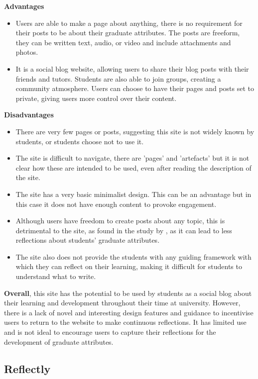 \documentclass{l4proj}
\begin{document}
\textbf{Advantages}
\begin{itemize}
    \item Users are able to make a page about anything, there is no requirement for their posts to be about their graduate attributes. The posts are freeform, they can be written text, audio, or video and include attachments and photos.
    \item It is a social blog website, allowing users to share their blog posts with their friends and tutors. Students are also able to join groups, creating 
    a community atmosphere. Users can choose to have their pages and posts set to private, giving users more control over their content.
\end{itemize}

\textbf{Disadvantages}
\begin{itemize}
    \item There are very few pages or posts, suggesting this site is not widely known by students, or students choose not to use it.
    \item The site is difficult to navigate, there are 'pages' and 'artefacts' but it is not clear how these are intended to be used, even after reading the 
    description of the site. 
    \item The site has a very basic minimalist design. This can be an advantage but in this case it does not have enough content to provoke engagement.
    \item Although users have freedom to create posts about any topic, this is detrimental to the site, as found in the study by 
    \citet{mcdermott_developing_nodate}, as it can lead to less reflections about students' graduate attributes.
    \item The site also does not provide the students with any guiding framework with which they can reflect on their learning, making it difficult for students
    to understand what to write.
\end{itemize}

\textbf{Overall}, this site has the potential to be used by students as a social blog about their learning and development throughout their time at university. However, there is a lack of novel and interesting design features and guidance to incentivise users to return to the website to make continuous reflections. It has limited use and is not ideal to encourage users to capture their reflections for the development of graduate attributes.

\subsection{Reflectly}
\end{document}
